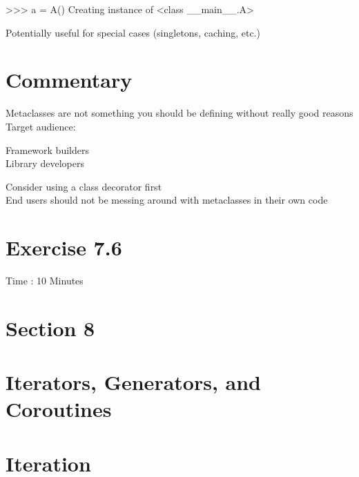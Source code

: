 \documentclass[
  letterpaper,
  DIV=11,
  numbers=noendperiod]{scrreprt}
\newenvironment{Shaded}{\begin{snugshade}}{\end{snugshade}}
\newcommand{\NormalTok}[1]{\textcolor[rgb]{0.00,0.23,0.31}{#1}}
\begin{document}
\begin{Shaded}
\begin{Highlighting}[]
\NormalTok{\textgreater{}\textgreater{}\textgreater{} a = A()}
\NormalTok{Creating instance of \textless{}class \textquotesingle{}\_\_main\_\_.A\textquotesingle{}\textgreater{} }
\end{Highlighting}
\end{Shaded}

Potentially useful for special cases (singletons, caching, etc.)


\chapter{Commentary}\label{commentary-4}

Metaclasses are not something you should be defining without really good
reasons\\
Target audience:

Framework builders\\
Library developers

Consider using a class decorator first\\
End users should not be messing around with metaclasses in their own
code


\chapter{Exercise 7.6}\label{exercise-7.6}

Time : 10 Minutes


\chapter{Section 8}\label{section-8}


\chapter{Iterators, Generators, and
Coroutines}\label{iterators-generators-and-coroutines}


\chapter{Iteration}\label{iteration-1}
\end{document}
